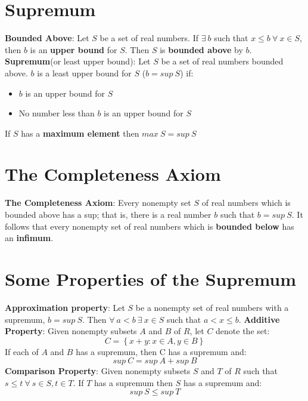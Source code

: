 \documentclass{article}
\begin{document}
\begin{flushleft}
\section{Supremum}
\textbf{Bounded Above}: Let $S$ be a set of real numbers. If $\exists \ b$ such that $x\leq b \ \forall \ x \in S$, then $b$ is an \textbf{upper bound} for $S$. Then $S$ is \textbf{bounded above} by $b$. \medbreak
\textbf{Supremum}(or least upper bound): Let $S$ be a set of real numbers bounded above. $b$ is a least upper bound for $S$ ($b=sup \ S$) if:
\begin{itemize}
\item $b$ is an upper bound for $S$
\item No number less than $b$ is an upper bound for $S$
\end{itemize}
If $S$ has a \textbf{maximum element} then $max \ S= sup \ S$ \medbreak
\section{The Completeness Axiom}
\textbf{The Completeness Axiom}: Every nonempty set $S$ of real numbers which is bounded above has a sup; that is, there is a real number $b$ such that $b=sup \ S$.\medbreak
It follows that every nonempty set of real numbers which is \textbf{bounded below} has an \textbf{infimum}. \medbreak
\section{Some Properties of the Supremum}
\textbf{Approximation property}: Let $S$ be a nonempty set of real numbers with a supremum, $b= sup \ S$. Then $\forall \ a<b \ \exists \ x \in S$ such that $a<x\leq b$. \medbreak
\textbf{Additive Property}: Given nonempty subsets $A$ and $B$ of $R$, let $C$ denote the set:
\[C=\left\{x+y:x\in A, y \in B \right\}
\]
If each of $A$ and $B$ has a supremum, then C has a supremum and:
\[sup \ C= sup \ A + sup \ B
\]
\textbf{Comparison Property}: Given nonempty subsets $S$ and $T$ of $R$ such that $s \leq t \ \forall \ s \in S , t \in T$. If $T$ has a supremum then $S$ has a supremum and:
\[sup \ S \leq sup \ T
\]


\end{flushleft}
\end{document}
